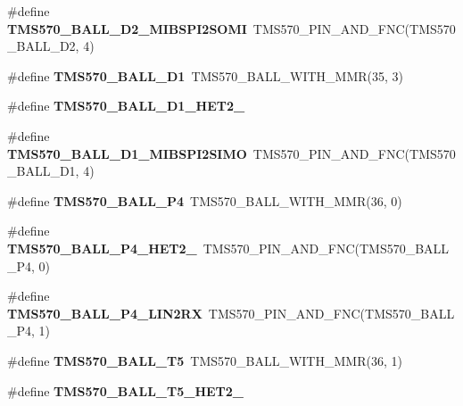 \begin{DoxyCompactItemize}
\mbox{\label{tms570lc4357-pins_8h_a814b73d68324975e7649811bfcfaa279}} 
\#define {\bfseries T\+M\+S570\+\_\+\+B\+A\+L\+L\+\_\+\+D2\+\_\+\+M\+I\+B\+S\+P\+I2\+S\+O\+MI}~T\+M\+S570\+\_\+\+P\+I\+N\+\_\+\+A\+N\+D\+\_\+\+F\+NC(T\+M\+S570\+\_\+\+B\+A\+L\+L\+\_\+\+D2, 4)
\item 
\mbox{\label{tms570lc4357-pins_8h_ad96489076c6515b423c8454bbacdc4d9}} 
\#define {\bfseries T\+M\+S570\+\_\+\+B\+A\+L\+L\+\_\+\+D1}~T\+M\+S570\+\_\+\+B\+A\+L\+L\+\_\+\+W\+I\+T\+H\+\_\+\+M\+MR(35, 3)
\item 
\#define {\bfseries T\+M\+S570\+\_\+\+B\+A\+L\+L\+\_\+\+D1\+\_\+\+H\+E\+T2\+\_}
\item 
\mbox{\label{tms570lc4357-pins_8h_a83f32d058fe840f538f2e0c44e21a96d}} 
\#define {\bfseries T\+M\+S570\+\_\+\+B\+A\+L\+L\+\_\+\+D1\+\_\+\+M\+I\+B\+S\+P\+I2\+S\+I\+MO}~T\+M\+S570\+\_\+\+P\+I\+N\+\_\+\+A\+N\+D\+\_\+\+F\+NC(T\+M\+S570\+\_\+\+B\+A\+L\+L\+\_\+\+D1, 4)
\item 
\mbox{\label{tms570lc4357-pins_8h_aa9273aacf1809556905bb8d08021c2ee}} 
\#define {\bfseries T\+M\+S570\+\_\+\+B\+A\+L\+L\+\_\+\+P4}~T\+M\+S570\+\_\+\+B\+A\+L\+L\+\_\+\+W\+I\+T\+H\+\_\+\+M\+MR(36, 0)
\item 
\mbox{\label{tms570lc4357-pins_8h_abea3c5e450ca5a360275e920d3527850}} 
\#define {\bfseries T\+M\+S570\+\_\+\+B\+A\+L\+L\+\_\+\+P4\+\_\+\+H\+E\+T2\+\_}~T\+M\+S570\+\_\+\+P\+I\+N\+\_\+\+A\+N\+D\+\_\+\+F\+NC(T\+M\+S570\+\_\+\+B\+A\+L\+L\+\_\+\+P4, 0)
\item 
\mbox{\label{tms570lc4357-pins_8h_ace7b3d2f0873bbdca87359ccf11b3bc3}} 
\#define {\bfseries T\+M\+S570\+\_\+\+B\+A\+L\+L\+\_\+\+P4\+\_\+\+L\+I\+N2\+RX}~T\+M\+S570\+\_\+\+P\+I\+N\+\_\+\+A\+N\+D\+\_\+\+F\+NC(T\+M\+S570\+\_\+\+B\+A\+L\+L\+\_\+\+P4, 1)
\item 
\mbox{\label{tms570lc4357-pins_8h_a881d83ff964a9b38cfceaf47d546e622}} 
\#define {\bfseries T\+M\+S570\+\_\+\+B\+A\+L\+L\+\_\+\+T5}~T\+M\+S570\+\_\+\+B\+A\+L\+L\+\_\+\+W\+I\+T\+H\+\_\+\+M\+MR(36, 1)
\item 
\#define {\bfseries T\+M\+S570\+\_\+\+B\+A\+L\+L\+\_\+\+T5\+\_\+\+H\+E\+T2\+\_}

\end{DoxyCompactItemize}
